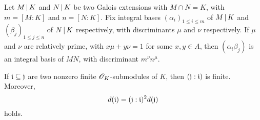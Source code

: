 \begin{prop}
  Let $M \mathop{|} K$ and $N \mathop{|} K$ be two Galois extensions
  with $M \cap N = K$, with $m = [M:K]$ and $n = [N:K]$. Fix integral bases
  $(\alpha_i)_{1 \le i \le m}$ of $M \mathop{|} K$ and $(\beta_j)_{1 \le j
  \le n}$ of $N \mathop{|} K$ respectively, with discriminants $\mu$ and
  $\nu$ respectively. If $\mu$ and $\nu$ are relatively prime, with $x\mu+y\nu
  = 1$ for some $x,y\in A$, then $(\alpha_i\beta_j)$ is an integral basis of
  $MN$, with discriminant $m^\nu n^\mu$.
\end{prop}


\begin{prop}
  If $\mathfrak{i} \subseteq \mathfrak{j}$ are two nonzero finite $\mathscr{O}_K$-submodules of $K$, then
  $(\mathfrak{j}:\mathfrak{i})$ is finite. Moreover,
  \[ d(\mathfrak{i}) = (\mathfrak{j}:\mathfrak{i})^2d(\mathfrak{j}) \] holds.
\end{prop}
